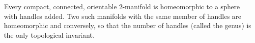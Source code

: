 \begin{theorem}[4.1]
Every compact, connected, orientable $2$-manifold is homeomorphic to a
sphere with handles added. Two such manifolds with the same member of
handles are homeomorphic and conversely, so that the number of handles
(called the genus) is the only topological invariant.
\end{theorem}

